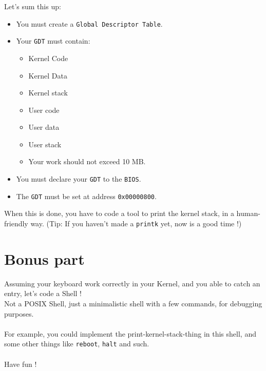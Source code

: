 \documentclass{42-en}
\begin{document}
	Let's sum this up:
	\begin{itemize}\itemsep1pt
		\item You must create a \texttt{Global Descriptor Table}.
		\item Your \texttt{GDT} must contain:
		\begin{itemize}\itemsep1pt
			\item Kernel Code
			\item Kernel Data
			\item Kernel stack
			\item User code
			\item User data
			\item User stack
			\item Your work should not exceed 10 MB.
		\end{itemize}
		\item You must declare your \texttt{GDT} to the \texttt{BIOS}.
		\item The \texttt{GDT} must be set at address \texttt{0x00000800}.
	\end{itemize}
	When this is done, you have to code a tool to print the kernel stack,
	in a human-friendly way. (Tip: If you haven't made a \texttt{printk} yet,
	now is a good time !)

\newpage
\chapter{Bonus part}

	Assuming your keyboard work correctly in your Kernel, and you able to catch
	an entry, let's code a Shell !\\
	Not a POSIX Shell, just a minimalistic shell with a few commands, for 
	debugging purposes.\\
	\\
	For example, you could implement the print-kernel-stack-thing in this shell,
	and some other things like \texttt{reboot}, \texttt{halt} and such.\\
	\\
	Have fun !

\newpage
\end{document}

